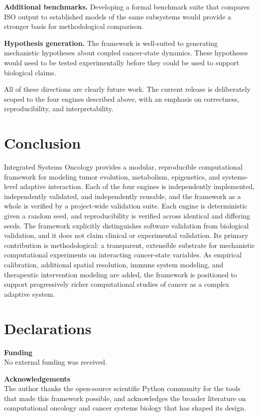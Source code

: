 \documentclass[12pt,a4paper]{article}
\begin{document}
\textbf{Additional benchmarks.} Developing a formal benchmark suite that compares ISO output to established models of the same subsystems would provide a stronger basis for methodological comparison.

\textbf{Hypothesis generation.} The framework is well-suited to generating mechanistic hypotheses about coupled cancer-state dynamics. These hypotheses would need to be tested experimentally before they could be used to support biological claims.

All of these directions are clearly future work. The current release is deliberately scoped to the four engines described above, with an emphasis on correctness, reproducibility, and interpretability.

\section{Conclusion}

Integrated Systems Oncology provides a modular, reproducible computational framework for modeling tumor evolution, metabolism, epigenetics, and systems-level adaptive interaction. Each of the four engines is independently implemented, independently validated, and independently reusable, and the framework as a whole is verified by a project-wide validation suite. Each engine is deterministic given a random seed, and reproducibility is verified across identical and differing seeds. The framework explicitly distinguishes software validation from biological validation, and it does not claim clinical or experimental validation. Its primary contribution is methodological: a transparent, extensible substrate for mechanistic computational experiments on interacting cancer-state variables. As empirical calibration, additional spatial resolution, immune system modeling, and therapeutic intervention modeling are added, the framework is positioned to support progressively richer computational studies of cancer as a complex adaptive system.

\section*{Declarations}

\textbf{Funding} \\
No external funding was received.

\textbf{Acknowledgements} \\
The author thanks the open-source scientific Python community for the tools that made this framework possible, and acknowledges the broader literature on computational oncology and cancer systems biology that has shaped its design.
\end{document}
